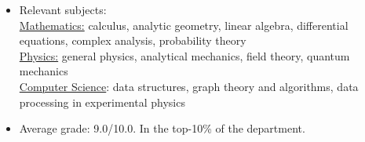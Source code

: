 \documentclass[10pt,a4paper,ragged2e]{altacv}
\begin{document}
\tagline{}

\begin{fullwidth}
\makecvheader
\end{fullwidth}



\begin{itemize}
\item Relevant subjects: \\
	\underline{Mathematics:} calculus, analytic geometry, linear algebra, differential equations, complex analysis, probability theory\\
	\underline{Physics:} general physics, analytical mechanics, field theory, quantum mechanics\\
	\underline{Computer Science}: data structures, graph theory and algorithms, data processing in experimental physics \\
\item Average grade: 9.0/10.0. In the top-10\% of the department.
\end{itemize}
\end{document}
